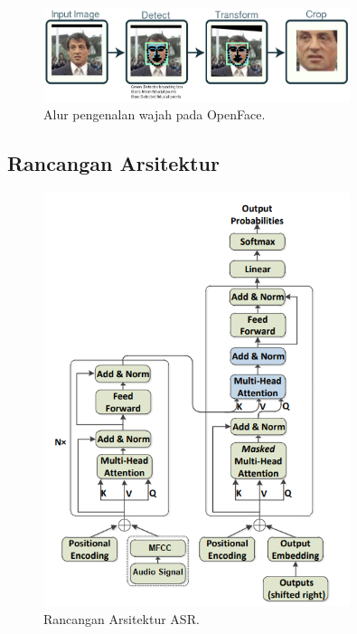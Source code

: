 \begin{figure}[h]
    \centering
    \includegraphics[width=0.8\textwidth]{resources/images/arsitektur-openface.png}
    \caption{Alur pengenalan wajah pada OpenFace.}
    \label{fig:arsitektur-openface}
\end{figure}


\subsection{Rancangan Arsitektur}

\begin{figure}[h]
    \centering
    \includegraphics[width=0.8\textwidth]{resources/images/usulan-arsitektur-asr.png}
    \caption{Rancangan Arsitektur ASR.}
    \label{fig:usulan-arsitektur-asr}
\end{figure}

